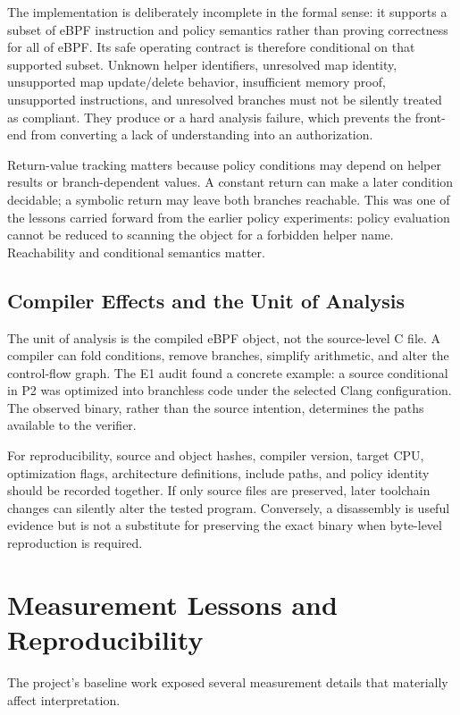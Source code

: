 The implementation is deliberately incomplete in the formal sense: it supports a subset of eBPF instruction and policy semantics rather than proving correctness for all of eBPF. Its safe operating contract is therefore conditional on that supported subset. Unknown helper identifiers, unresolved map identity, unsupported map update/delete behavior, insufficient memory proof, unsupported instructions, and unresolved branches must not be silently treated as compliant. They produce \unknown or a hard analysis failure, which prevents the front-end from converting a lack of understanding into an authorization.

Return-value tracking matters because policy conditions may depend on helper results or branch-dependent values. A constant return can make a later condition decidable; a symbolic return may leave both branches reachable. This was one of the lessons carried forward from the earlier policy experiments: policy evaluation cannot be reduced to scanning the object for a forbidden helper name. Reachability and conditional semantics matter.

\subsection{Compiler Effects and the Unit of Analysis}
The unit of analysis is the compiled eBPF object, not the source-level C file. A compiler can fold conditions, remove branches, simplify arithmetic, and alter the control-flow graph. The E1 audit found a concrete example: a source conditional in P2 was optimized into branchless code under the selected Clang configuration. The observed binary, rather than the source intention, determines the paths available to the verifier.

For reproducibility, source and object hashes, compiler version, target CPU, optimization flags, architecture definitions, include paths, and policy identity should be recorded together. If only source files are preserved, later toolchain changes can silently alter the tested program. Conversely, a disassembly is useful evidence but is not a substitute for preserving the exact binary when byte-level reproduction is required.

\section{Measurement Lessons and Reproducibility}
The project's baseline work exposed several measurement details that materially affect interpretation.

